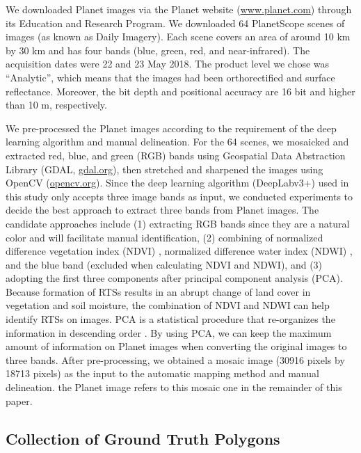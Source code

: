 \documentclass[authoryear,preprint,review,12pt]{elsarticle}
\begin{document}
We downloaded Planet images via the Planet website (\url{www.planet.com}) through its Education and Research Program. We downloaded 64 PlanetScope scenes of images (as known as Daily Imagery). Each scene covers an area of around 10 km by 30 km and has four bands (blue, green, red, and near-infrared). The acquisition dates were  22 and 23 May 2018. The product level we chose was ``Analytic'', which means that the images had been orthorectified and  surface reflectance. Moreover, the bit depth and positional accuracy are 16 bit and higher than 10 m, respectively. %

We pre-processed the Planet images according to the requirement of the deep learning algorithm and manual delineation. For the 64 scenes, we mosaicked and extracted red, blue, and green (RGB) bands using Geospatial Data Abstraction Library (GDAL, \url{gdal.org}), then stretched and sharpened the images using OpenCV (\url{opencv.org}). Since the deep learning algorithm (DeepLabv3+) used in this study only accepts three image bands as input, we conducted experiments to decide the best approach to extract three bands from Planet images. The candidate approaches include (1) extracting RGB bands since they are a natural color and will facilitate manual identification, (2) combining of normalized difference vegetation index (NDVI) \citep{rouse1974monitoring}, normalized difference water index (NDWI) \citep{mcfeeters1996use}, and the blue band (excluded when calculating NDVI and NDWI), and (3) adopting the first three components after principal component analysis (PCA). Because formation of RTSs results in an abrupt change of land cover in vegetation and soil moisture, the combination of NDVI and NDWI can help identify RTSs on images. PCA is a statistical procedure that re-organizes the information in descending order \citep{wold1987principal}. By using PCA, we can keep the maximum amount of information on Planet images when converting the original images to three bands. 
 After pre-processing, we obtained a mosaic image (30916 pixels by 18713 pixels) as the input to the automatic mapping method and manual delineation.  the Planet image refers to this mosaic one in the remainder of this paper.

\subsection{Collection of Ground Truth Polygons}
\label{subsec_collect_groundtruth}
\end{document}
